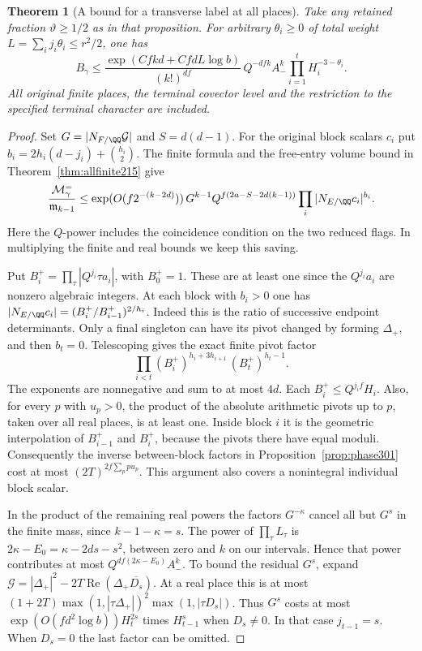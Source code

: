 \documentclass[a4paper,11pt]{article}
\newtheorem{theorem}[proposition]{Theorem}
\theoremstyle{definition}
\theoremstyle{remark}
\numberwithin{equation}{section}
\begin{document}
\begin{theorem}[A bound for a transverse label at all places]\leavevmode
\label{thm:product301}
Take any retained fraction \(\vartheta\ge1/2\) as in that
proposition. For arbitrary \(\theta_i\ge0\) of total weight
\(L=\sum_i j_i\theta_i\le r^2/2\), one has
\[
 B_\gamma \le
 \frac{\exp(Cfkd+CfdL\log b)}{(k!)^{df}}\,
          Q^{-dfk} A_-^k\prod_{i=1}^t H_i^{-3-\theta_i}.
\]
All original finite places, the terminal covector level and
the restriction to the specified terminal character are
included.
\end{theorem}
\begin{proof}
Set \(G=|N_{F/\QQ}\mathcal G|\) and \(S=d(d-1)\).
For the original block scalars \(c_i\) put
\(b_i=2h_i(d-j_i)+\binom{h_i}{2}\).
The finite formula and the free-entry volume bound in
Theorem~\ref{thm:allfinite215} give
\[
 \frac{\mathcal M_\gamma^{=}}{\mathfrak m_{k-1}}
 \le \exp(O(f2^{-(k-2d)}))\,
     G^{k-1} Q^{f(2a-S-2d(k-1))}
                          \prod_i |N_{E/\QQ}c_i|^{b_i}.
\]
Here the \(Q\)-power includes the coincidence condition on
the two reduced flags. In multiplying the finite and real
bounds we keep this saving.

Put \(B_i^+=\prod_\tau|Q^{j_i}\tau a_i|\), with \(B_0^+=1\).
These are at least one since the \(Q^{j_i}a_i\) are nonzero
algebraic integers. At each block with \(b_i>0\) one has
\(|N_{E/\QQ}c_i|=(B_i^+/B_{i-1}^+)^{2/h_i}\).
Indeed this is the ratio of successive endpoint determinants.
Only a final singleton can have its pivot changed by forming
\(\Delta_+\), and then \(b_t=0\).
Telescoping gives the exact finite pivot factor
\[
        \prod_{i<t}(B_i^+)^{h_i+3h_{i+1}}\,
                       (B_t^+)^{h_t-1}.
\]
The exponents are nonnegative and sum to at most \(4d\).
Each \(B_i^+\le Q^{j_i f}H_i\). Also, for every \(p\)
with \(u_p>0\), the product of the absolute arithmetic pivots
up to \(p\), taken over all real places, is at least one.
Inside block \(i\) it is the geometric interpolation of
\(B_{i-1}^+\) and \(B_i^+\), because the pivots there have
equal moduli. Consequently the inverse between-block factors
in Proposition~\ref{prop:phase301} cost at most
\((2T)^{2f\sum_p p u_p}\). This argument also covers a
nonintegral individual block scalar.

In the product of the remaining real powers the factors
\(G^{-\kappa}\) cancel all but \(G^s\) in the finite mass,
since \(k-1-\kappa=s\). The power of \(\prod_\tau L_\tau\)
is \(2\kappa-E_0=\kappa-2ds-s^2\), between zero and \(k\)
on our intervals. Hence that power contributes at most
\(Q^{df(2\kappa-E_0)} A_-^k\).
To bound the residual \(G^s\), expand
\(\mathcal G=|\Delta_+|^2-2T\operatorname{Re}
(\Delta_+\overline{D_s})\). At a real place this is at most
\((1+2T)\max(1,|\tau\Delta_+|)^2\max(1,|\tau D_s|)\).
Thus \(G^s\) costs at most
\(\exp(O(fd^2\log b))H_t^{2s}\) times \(H_{t-1}^s\) when
\(D_s\ne0\). In that case \(j_{t-1}=s\).
When \(D_s=0\) the last factor can be omitted.


\end{proof}
\end{document}
